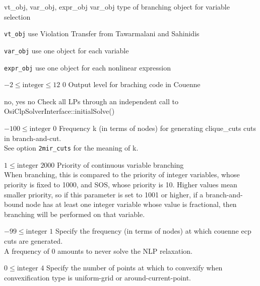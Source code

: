 %
{vt\_obj, var\_obj, expr\_obj}%
{var\_obj}%
{type of branching object for variable selection}%
{\begin{list}{}{
\setlength{\parsep}{0em}
\setlength{\leftmargin}{5ex}
\setlength{\labelwidth}{2ex}
\setlength{\itemindent}{0ex}
\setlength{\topsep}{0pt}}
\item[\texttt{vt\_obj}] use Violation Transfer from Tawarmalani and Sahinidis
\item[\texttt{var\_obj}] use one object for each variable
\item[\texttt{expr\_obj}] use one object for each nonlinear expression
\end{list}
}

%
{$-2\leq\textrm{integer}\leq12$}%
{$0$}%
{Output level for braching code in Couenne}%
{}

%
{no, yes}%
{no}%
{Check all LPs through an independent call to OsiClpSolverInterface::initialSolve()}%
{}

%
{$-100\leq\textrm{integer}$}%
{$0$}%
{Frequency k (in terms of nodes) for generating clique\_cuts cuts in branch-and-cut.\\
See option \texttt{2mir\_cuts} for the meaning of k.}%
{}

%
{$1\leq\textrm{integer}$}%
{$2000$}%
{Priority of continuous variable branching\\
When branching, this is compared to the priority of integer variables, whose priority is fixed to 1000, and SOS, whose priority is 10. Higher values mean smaller priority, so if this parameter is set to 1001 or higher, if a branch-and-bound node has at least one integer variable whose value is fractional, then branching will be performed on that variable.}%
{}

%
{$-99\leq\textrm{integer}$}%
{$1$}%
{Specify the frequency (in terms of nodes) at which couenne ecp cuts are generated.\\
A frequency of 0 amounts to never solve the NLP relaxation.}%
{}

%
{$0\leq\textrm{integer}$}%
{$4$}%
{Specify the number of points at which to convexify when convexification type is uniform-grid or around-current-point.}%
{}

